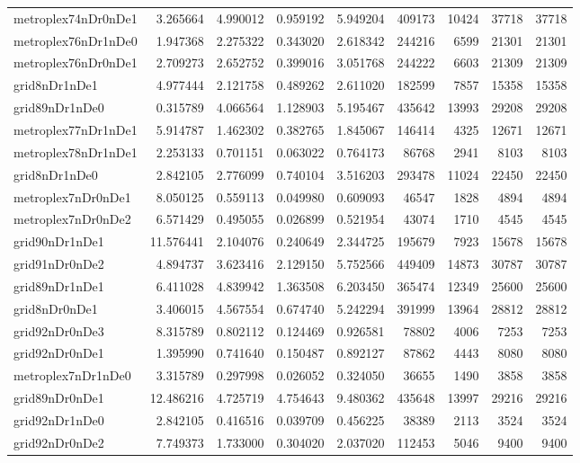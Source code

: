 \begin{longtable}{|l|r|r|r|r|r|r|r|r|}
metroplex74nDr0nDe1 & 3.265664 & 4.990012 & 0.959192 & 5.949204 & 409173 & 10424 & 37718 & 37718 \\
metroplex76nDr1nDe0 & 1.947368 & 2.275322 & 0.343020 & 2.618342 & 244216 & 6599 & 21301 & 21301 \\
metroplex76nDr0nDe1 & 2.709273 & 2.652752 & 0.399016 & 3.051768 & 244222 & 6603 & 21309 & 21309 \\
grid8nDr1nDe1 & 4.977444 & 2.121758 & 0.489262 & 2.611020 & 182599 & 7857 & 15358 & 15358 \\
grid89nDr1nDe0 & 0.315789 & 4.066564 & 1.128903 & 5.195467 & 435642 & 13993 & 29208 & 29208 \\
metroplex77nDr1nDe1 & 5.914787 & 1.462302 & 0.382765 & 1.845067 & 146414 & 4325 & 12671 & 12671 \\
metroplex78nDr1nDe1 & 2.253133 & 0.701151 & 0.063022 & 0.764173 & 86768 & 2941 & 8103 & 8103 \\
grid8nDr1nDe0 & 2.842105 & 2.776099 & 0.740104 & 3.516203 & 293478 & 11024 & 22450 & 22450 \\
metroplex7nDr0nDe1 & 8.050125 & 0.559113 & 0.049980 & 0.609093 & 46547 & 1828 & 4894 & 4894 \\
metroplex7nDr0nDe2 & 6.571429 & 0.495055 & 0.026899 & 0.521954 & 43074 & 1710 & 4545 & 4545 \\
grid90nDr1nDe1 & 11.576441 & 2.104076 & 0.240649 & 2.344725 & 195679 & 7923 & 15678 & 15678 \\
grid91nDr0nDe2 & 4.894737 & 3.623416 & 2.129150 & 5.752566 & 449409 & 14873 & 30787 & 30787 \\
grid89nDr1nDe1 & 6.411028 & 4.839942 & 1.363508 & 6.203450 & 365474 & 12349 & 25600 & 25600 \\
grid8nDr0nDe1 & 3.406015 & 4.567554 & 0.674740 & 5.242294 & 391999 & 13964 & 28812 & 28812 \\
grid92nDr0nDe3 & 8.315789 & 0.802112 & 0.124469 & 0.926581 & 78802 & 4006 & 7253 & 7253 \\
grid92nDr0nDe1 & 1.395990 & 0.741640 & 0.150487 & 0.892127 & 87862 & 4443 & 8080 & 8080 \\
metroplex7nDr1nDe0 & 3.315789 & 0.297998 & 0.026052 & 0.324050 & 36655 & 1490 & 3858 & 3858 \\
grid89nDr0nDe1 & 12.486216 & 4.725719 & 4.754643 & 9.480362 & 435648 & 13997 & 29216 & 29216 \\
grid92nDr1nDe0 & 2.842105 & 0.416516 & 0.039709 & 0.456225 & 38389 & 2113 & 3524 & 3524 \\
grid92nDr0nDe2 & 7.749373 & 1.733000 & 0.304020 & 2.037020 & 112453 & 5046 & 9400 & 9400 \\

\end{longtable}
